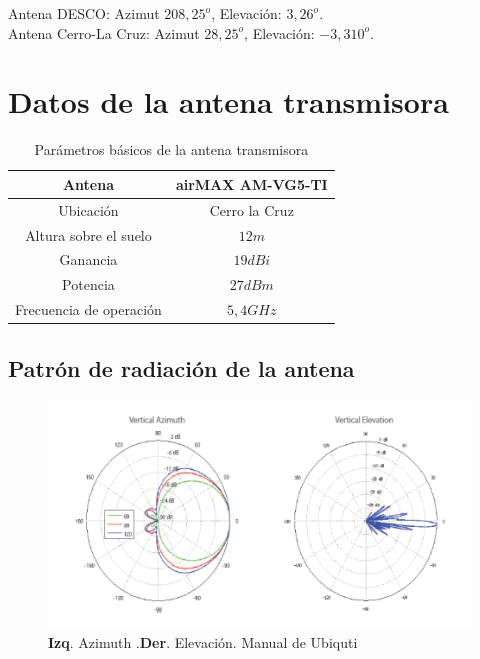 \documentclass[11pt, a4paper, twosides]{report}
\begin{document}
Antena DESCO: Azimut  $208,25^{o}$, Elevación: $3,26^{o}$. \\
Antena Cerro-La Cruz: Azimut  $28,25^{o}$, Elevación: $-3,310^{o}$.

\section{Datos de la antena transmisora}

\begin{table}[ht]
\centering
 \begin{tabular}{|c|c|}
	\hline \cellcolor{gray75} Antena  & \cellcolor{gray75} airMAX AM-VG5-TI \\ 
	\hline Ubicación & Cerro la Cruz  \\ 
	\hline Altura sobre el suelo & $12m$ \\ 
	\hline Ganancia & $19dBi$\\ 
	\hline Potencia & $27 dBm$\\
	\hline Frecuencia de operación & $5,4 GHz$\\
	\hline 
\end{tabular}
\caption{Parámetros básicos de la antena transmisora}
\label{tab:AntC}
\end{table}

\subsection{Patrón de radiación de la antena}
\begin{figure}[h]
    \centering
    \includegraphics[width=1\linewidth]{antC.png}
    \caption{\textbf{Izq}. Azimuth .\textbf{Der}. Elevación. Manual de Ubiquti}
    \label{fig:antc}
\end{figure}
\newpage
\end{document}
